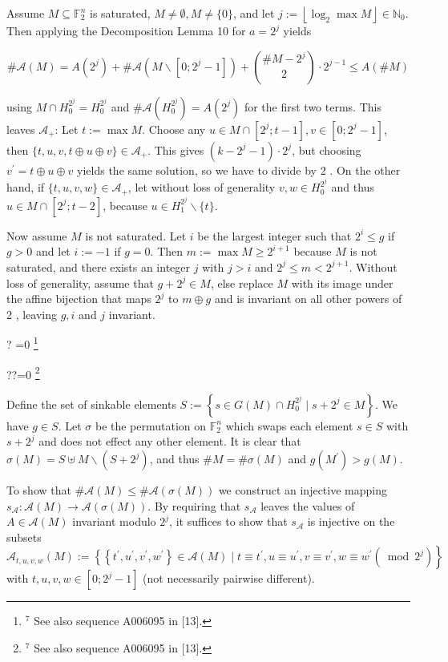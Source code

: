 \documentclass[10pt]{article}
\let\svthefootnote\thefootnote
\newcommand\blfootnotetext[1]{%
  \let\thefootnote\relax\footnote{#1}%
  \addtocounter{footnote}{-1}%
  \let\thefootnote\svthefootnote%
}
\let\svfootnotetext\footnotetext
\renewcommand\footnotetext[2][?]{%
  \if\relax#1\relax%
    \ifnum\value{footnote}=0\blfootnotetext{#2}\else\svfootnotetext{#2}\fi%
  \else%
    \if?#1\ifnum\value{footnote}=0\blfootnotetext{#2}\else\svfootnotetext{#2}\fi%
    \else\svfootnotetext[#1]{#2}\fi%
  \fi
}
\begin{document}
Assume $M \subseteq \mathbb{F}_{2}^{n}$ is saturated, $M \neq \emptyset, M \neq\{0\}$, and let $j:=\left\lfloor\log _{2} \max M\right\rfloor \in \mathbb{N}_{0}$. Then applying the Decomposition Lemma 10 for $a=2^{j}$ yields


\begin{equation*}
\# \mathcal{A}(M)=A\left(2^{j}\right)+\# \mathcal{A}\left(M \backslash\left[0 ; 2^{j}-1\right]\right)+\binom{\# M-2^{j}}{2} \cdot 2^{j-1} \leq A(\# M) \tag{24}
\end{equation*}


using $M \cap H_{0}^{2^{j}}=H_{0}^{2^{j}}$ and $\# \mathcal{A}\left(H_{0}^{2^{j}}\right)=A\left(2^{j}\right)$ for the first two terms. This leaves $\mathcal{A}_{+}$: Let $t:=\max M$. Choose any $u \in M \cap\left[2^{j} ; t-1\right], v \in\left[0 ; 2^{j}-1\right]$, then $\{t, u, v, t \oplus u \oplus v\} \in \mathcal{A}_{+}$. This gives $\left(k-2^{j}-1\right) \cdot 2^{j}$, but choosing $v^{\prime}= t \oplus u \oplus v$ yields the same solution, so we have to divide by 2 . On the other hand, if $\{t, u, v, w\} \in \mathcal{A}_{+}$, let without loss of generality $v, w \in H_{0}^{2^{j}}$ and thus $u \in M \cap\left[2^{j} ; t-2\right]$, because $u \in H_{1}^{2^{j}} \backslash\{t\}$.

Now assume $M$ is not saturated. Let $i$ be the largest integer such that $2^{i} \leq g$ if $g>0$ and let $i:=-1$ if $g=0$. Then $m:=\max M \geq 2^{i+1}$ because $M$ is not saturated, and there exists an integer $j$ with $j>i$ and $2^{j} \leq m<2^{j+1}$. Without loss of generality, assume that $g+2^{j} \in M$, else replace $M$ with its image under the affine bijection that maps $2^{j}$ to $m \oplus g$ and is invariant on all other powers of 2 , leaving $g, i$ and $j$ invariant.

Define the set of sinkable elements $S:=\left\{s \in G(M) \cap H_{0}^{2^{j}} \mid s+2^{j} \in M\right\}$. We have $g \in S$. Let $\sigma$ be the permutation on $\mathbb{F}_{2}^{n}$ which swaps each element $s \in S$ with $s+2^{j}$ and does not effect any other element. It is clear that $\sigma(M)= S \uplus M \backslash\left(S+2^{j}\right)$, and thus $\# M=\# \sigma(M)$ and $g\left(M^{\prime}\right)>g(M)$.

To show that $\# \mathcal{A}(M) \leq \# \mathcal{A}(\sigma(M))$ we construct an injective mapping $s_{\mathcal{A}}: \mathcal{A}(M) \rightarrow \mathcal{A}(\sigma(M))$. By requiring that $s_{\mathcal{A}}$ leaves the values of $A \in \mathcal{A}(M)$ invariant modulo $2^{j}$, it suffices to show that $s_{\mathcal{A}}$ is injective on the subsets $\mathcal{A}_{t, u, v, w}(M):=\left\{\left\{t^{\prime}, u^{\prime}, v^{\prime}, w^{\prime}\right\} \in \mathcal{A}(M) \mid t \equiv t^{\prime}, u \equiv u^{\prime}, v \equiv v^{\prime}, w \equiv w^{\prime}\right. \left.\left(\bmod 2^{j}\right)\right\}$ with $t, u, v, w \in\left[0 ; 2^{j}-1\right]$ (not necessarily pairwise different).
\end{document}
